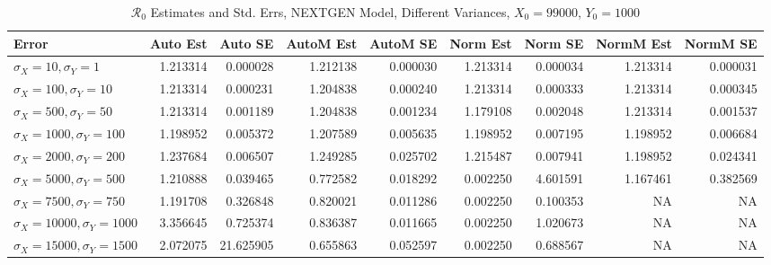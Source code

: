 \documentclass[12pt]{article}
\newcommand{\rr}{\ensuremath{\mathcal{R}_0}}
\begin{document}
\begin{table}[H]
	
	\caption{$\rr$ Estimates and Std. Errs, NEXTGEN Model, 
		Different Variances, $X_0 = 99000$, $Y_0 = 1000$}
	\begin{footnotesize}
		\hskip -1.7cm
		\begin{tabular}{l|r|r|r|r|r|r|r|r}
			\hline
			Error & Auto Est & Auto SE & AutoM Est & AutoM SE & Norm Est & Norm SE & NormM Est & NormM SE\\
			\hline
			$\sigma_X = 10, \sigma_Y = 1$ & 1.213314 & 0.000028 & 1.212138 & 0.000030 & 1.213314 & 0.000034 & 1.213314 & 0.000031\\
			\hline
			$\sigma_X = 100, \sigma_Y = 10$ & 1.213314 & 0.000231 & 1.204838 & 0.000240 & 1.213314 & 0.000333 & 1.213314 & 0.000345\\
			\hline
			$\sigma_X = 500, \sigma_Y = 50$ & 1.213314 & 0.001189 & 1.204838 & 0.001234 & 1.179108 & 0.002048 & 1.213314 & 0.001537\\
			\hline
			$\sigma_X = 1000, \sigma_Y = 100$ & 1.198952 & 0.005372 & 1.207589 & 0.005635 & 1.198952 & 0.007195 & 1.198952 & 0.006684\\
			\hline
			$\sigma_X = 2000, \sigma_Y = 200$ & 1.237684 & 0.006507 & 1.249285 & 0.025702 & 1.215487 & 0.007941 & 1.198952 & 0.024341\\
			\hline
			$\sigma_X = 5000, \sigma_Y = 500$ & 1.210888 & 0.039465 & 0.772582 & 0.018292 & 0.002250 & 4.601591 & 1.167461 & 0.382569\\
			\hline
			$\sigma_X = 7500, \sigma_Y = 750$ & 1.191708 & 0.326848 & 0.820021 & 0.011286 & 0.002250 & 0.100353 & NA & NA\\
			\hline
			$\sigma_X = 10000, \sigma_Y = 1000$ & 3.356645 & 0.725374 & 0.836387 & 0.011665 & 0.002250 & 1.020673 & NA & NA\\
			\hline
			$\sigma_X = 15000, \sigma_Y = 1500$ & 2.072075 & 21.625905 & 0.655863 & 0.052597 & 0.002250 & 0.688567 & NA & NA\\
			\hline
		\end{tabular}
	\end{footnotesize}
\end{table}
\end{document}
